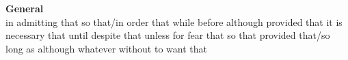 {\sffamily\bfseries General}\\
   {in admitting that}
   {so that/in order that}
   {while}
   {before}
   {although}
   {provided that}
   {it is necessary that}
   {until}
   {despite that}
   {unless}   
   {for fear that}
   {so that}
   {provided that/so long as}
   {although}
   {whatever}
   {without}
   {to want that}
